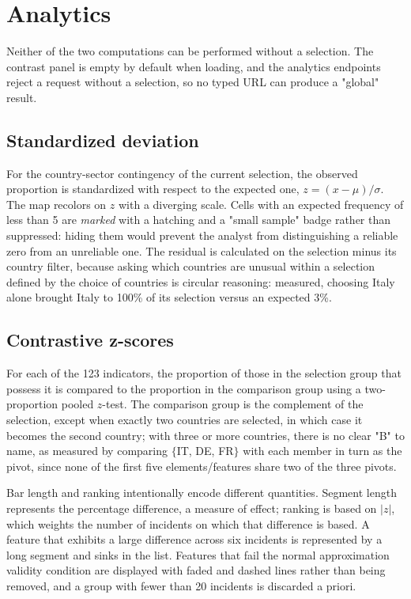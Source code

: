 \documentclass[conference]{IEEEtran}
\begin{document}
\section{Analytics}

Neither of the two computations can be performed without a selection. The contrast panel is empty by default when loading, and the analytics endpoints reject a request without a selection, so no typed URL can produce a "global" result.

\subsection{Standardized deviation}

For the country-sector contingency of the current selection, the observed proportion is standardized with respect to the expected one, $z=(x-\mu)/\sigma$. The map recolors on $z$ with a diverging scale. Cells with an expected frequency of less than 5 are \emph{marked} with a hatching and a "small sample" badge rather than suppressed: hiding them would prevent the analyst from distinguishing a reliable zero from an unreliable one. The residual is calculated on the selection minus its country filter, because asking which countries are unusual within a selection defined by the choice of countries is circular reasoning: measured, choosing Italy alone brought Italy to 100\% of its selection versus an expected 3\%.

\subsection{Contrastive z-scores}

For each of the 123 indicators, the proportion of those in the selection group that possess it is compared to the proportion in the comparison group using a two-proportion pooled $z$-test. The comparison group is the complement of the selection, except when exactly two countries are selected, in which case it becomes the second country; with three or more countries, there is no clear "B" to name, as measured by comparing $\{$IT, DE, FR$\}$ with each member in turn as the pivot, since none of the first five elements/features share two of the three pivots.

Bar length and ranking intentionally encode different quantities. Segment length represents the percentage difference, a measure of effect; ranking is based on $|z|$, which weights the number of incidents on which that difference is based. A feature that exhibits a large difference across six incidents is represented by a long segment and sinks in the list. Features that fail the normal approximation validity condition are displayed with faded and dashed lines rather than being removed, and a group with fewer than 20 incidents is discarded a priori.
\end{document}
